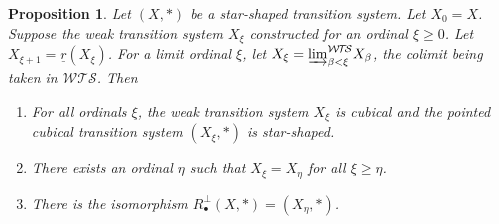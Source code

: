 \documentclass[a4paper,12pt]{amsart}
\newtheorem{prop}[thm]{Proposition}
\begin{document}
\begin{prop} \label{rperp-explicite} Let $(X,*)$ be a star-shaped transition
system. Let $X_0 = X$.  Suppose the weak transition system $X_\xi$
constructed for an ordinal $\xi {\geqslant} 0$. Let
$X_{\xi+1}=\underline{r}(X_\xi)$. For a limit ordinal $\xi$, let
$X_\xi = {\varinjlim}^{\mathcal{W\!T\!S}}_{\beta<\xi} X_\beta$, the colimit being taken in
${\mathcal{W\!T\!S}}$. Then
\begin{enumerate}
\item For all ordinals $\xi$, the weak transition system $X_\xi$ is
  cubical and the pointed cubical transition system $(X_\xi,*)$ is
  star-shaped.
\item There exists an ordinal $\eta$ such that $X_\xi = X_\eta$ for all 
$\xi {\geqslant} \eta$.
\item There is the isomorphism $R_\bullet^\perp(X,*)=(X_\eta,*)$. 
\end{enumerate}
\end{prop} 
\end{document}
